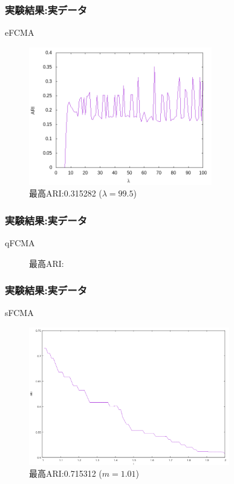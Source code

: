 \documentclass[13pt,dvipdfmx]{beamer}
\begin{document}
\begin{frame}\frametitle{実験結果:実データ}
  \begin{block}{eFCMA}
    \begin{figure}[htbp]
      \begin{center}
        \includegraphics[height=60mm]{efcma_ARI.png}
      \end{center}
      \captionsetup{labelformat=empty,labelsep=none}
      \caption{最高ARI:0.315282 ($\lambda=99.5$)}
    \end{figure}
  \end{block}
\end{frame}


\begin{frame}\frametitle{実験結果:実データ}
  \begin{block}{qFCMA}
    \begin{figure}[htbp]
      \begin{center}
      \end{center}
      \captionsetup{labelformat=empty,labelsep=none}
      \caption{最高ARI:}
    \end{figure}
  \end{block}
\end{frame}

\begin{frame}\frametitle{実験結果:実データ}
  \begin{block}{sFCMA}
    \begin{figure}[htbp]
      \begin{center}
        \includegraphics[height=60mm]{sfcma_ARI.png}
      \end{center}
      \captionsetup{labelformat=empty,labelsep=none}
      \caption{最高ARI:0.715312 ($m=1.01$)}
    \end{figure}
  \end{block}
\end{frame}
\end{document}
